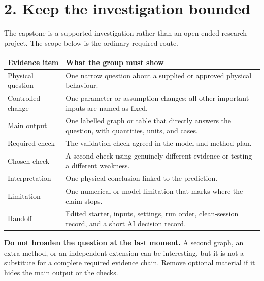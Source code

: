 \documentclass[11pt,a4paper]{article}
\begin{document}
\section*{2. Keep the investigation bounded}
The capstone is a supported investigation rather than an open-ended research project. The scope below is the ordinary required route.
\begin{center}\small
\begin{tabular}{>{\raggedright\arraybackslash}p{.25\linewidth}>{\raggedright\arraybackslash}p{.62\linewidth}}
\toprule
\textbf{Evidence item} & \textbf{What the group must show}\\ \midrule
Physical question & One narrow question about a supplied or approved physical behaviour.\\
Controlled change & One parameter or assumption changes; all other important inputs are named as fixed.\\
Main output & One labelled graph or table that directly answers the question, with quantities, units, and cases.\\
Required check & The validation check agreed in the model and method plan.\\
Chosen check & A second check using genuinely different evidence or testing a different weakness.\\
Interpretation & One physical conclusion linked to the prediction.\\
Limitation & One numerical or model limitation that marks where the claim stops.\\
Handoff & Edited starter, inputs, settings, run order, clean-session record, and a short AI decision record.\\
\bottomrule
\end{tabular}
\end{center}
\begin{aibox}\textbf{Do not broaden the question at the last moment.} A second graph, an extra method, or an independent extension can be interesting, but it is not a substitute for a complete required evidence chain. Remove optional material if it hides the main output or the checks.\end{aibox}
\end{document}
